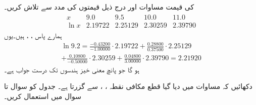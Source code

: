 \quad {}\\
 کی قیمت مساوات  اور درج ذیل قیمتوں کی مدد سے تلاش کریں۔
\begin{align*}
\begin{array}{ccccc}
x&9.0&9.5&10.0&11.0\\
\ln x&\num{2.19722}&\num{2.25129}&\num{2.30259}&\num{2.39790}
\end{array}
\end{align*}
ہمارے پاس ، ،  ہیں۔یوں 
\begin{multline*}
\ln 9.2=\frac{-0.43200}{-1.00000}\cdot 2.19722+\frac{0.28800}{0.37500}\cdot 2.25129\\
+\frac{0.10800}{-0.50000}\cdot 2.30259+\frac{0.04800}{3.00000}\cdot 2.39790=2.21920
\end{multline*}
ہو گا جو پانچ معنی خیز ہندسوں تک درست جواب ہے۔

\quad
دکھائیں کہ مساوات  میں دیا گیا قطع مکافی نقطہ ، ،  سے گزرتا ہے۔
جدول  کو سوال  تا سوال  میں استعمال کریں۔

